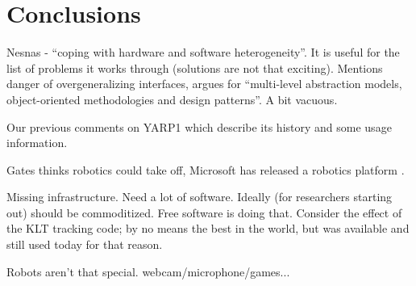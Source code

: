 
\section{Conclusions}




Nesnas \cite{nesnas2006claraty} - ``coping with hardware and software 
heterogeneity''.  It is useful for the list of problems it
works through (solutions are not that exciting).
%
Mentions danger of overgeneralizing interfaces, argues for 
``multi-level abstraction models, object-oriented methodologies
and design patterns''.  A bit vacuous.



Our previous comments on YARP1 \cite{metta2006yarp} which
describe its history and some usage information.

Gates thinks robotics could take off, Microsoft has
released a robotics platform \cite{gates2007robot}.

Missing infrastructure.
Need a lot of software.
Ideally (for researchers starting out) should be commoditized.
Free software is doing that.
%
Consider the effect of the KLT tracking code; by no means
the best in the world, but was available and still used
today for that reason.



Robots aren't that special.  webcam/microphone/games...








